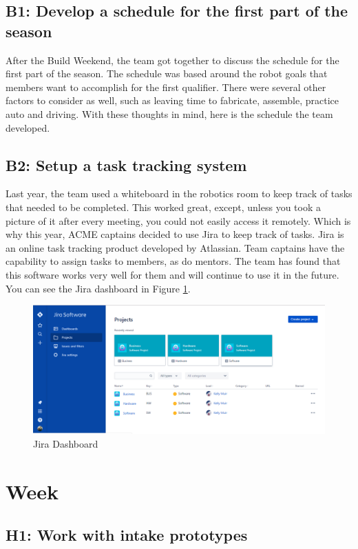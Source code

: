 \documentclass{article}
\begin{document}
\subsection{B1: Develop a schedule for the first part of the season}

After the Build Weekend, the team got together to discuss the schedule for the first part of the season. The schedule was based around the robot goals that members want to accomplish for the first qualifier. There were several other factors to consider as well, such as leaving time to fabricate, assemble, practice auto and driving. With these thoughts in mind, here is the schedule the team developed. 

\subsection{B2: Setup a task tracking system}

Last year, the team used a whiteboard in the robotics room to keep track of tasks that needed to be completed. This worked great, except, unless you took a picture of it after every meeting, you could not easily access it remotely. Which is why this year, ACME captains decided to use Jira to keep track of tasks. Jira is an online task tracking product developed by Atlassian. Team captains have the capability to assign tasks to members, as do mentors. The team has found that this software works very well for them and will continue to use it in the future. You can see the Jira dashboard in Figure \ref{fig:jiradash}.

\begin{figure}
    \centering
    \includegraphics[width=.6\textwidth]{02_09-10/images/jiradash.png}
    \caption{Jira Dashboard}
    \label{fig:jiradash}
\end{figure}
\clearpage \newpage \section{Week \thesection} 
\subsection{H1: Work with intake prototypes}
\end{document}
